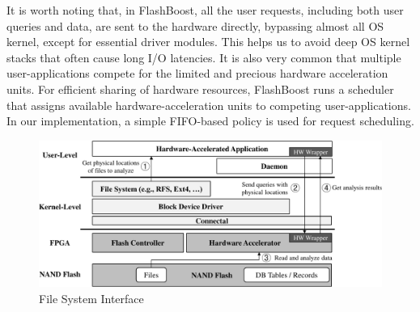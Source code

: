 It is worth noting that, in FlashBoost, all the user requests, including both
user queries and data, are sent to the hardware directly, bypassing almost all
OS kernel, except for essential driver modules.  This helps us to avoid deep OS
kernel stacks that often cause long I/O latencies.  It is also very common that
multiple user-applications compete for the limited and precious hardware
acceleration units. For efficient sharing of hardware resources, FlashBoost runs
a scheduler that assigns available hardware-acceleration units to competing
user-applications. In our implementation, a simple FIFO-based policy is used for
request scheduling.

\begin{figure}[h]
	\begin{center}
	\includegraphics[width=0.4\paperwidth]{figures/software.pdf}
	\caption{File System Interface}
	\label{fig:filesystem}
	\end{center}
\end{figure}
